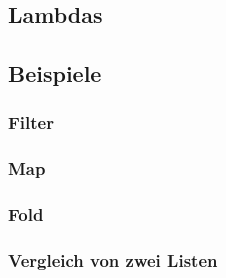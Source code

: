 
\subsection{Lambdas}

\subsection{Beispiele}

	\subsubsection{Filter}
	
	\subsubsection{Map}
	
	\subsubsection{Fold}
	
	\subsubsection{Vergleich von zwei Listen}
